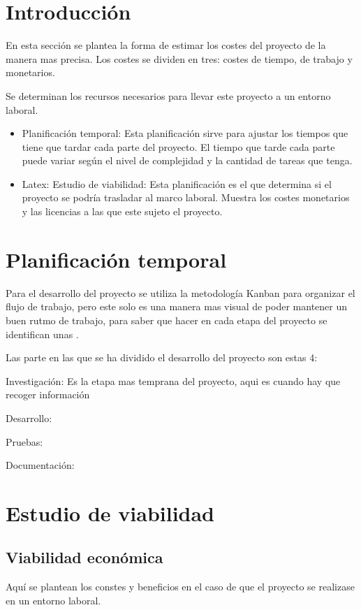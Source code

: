 
\section{Introducción}
En esta sección se plantea la forma de estimar los costes del proyecto de la manera mas precisa. Los costes se dividen en tres: costes de tiempo, de trabajo y monetarios.

Se determinan los recursos necesarios para llevar este proyecto a un entorno laboral.


\begin{itemize}
	\item Planificación temporal: Esta planificación sirve para ajustar los tiempos que tiene que tardar cada parte del proyecto. El tiempo que tarde cada parte puede variar según el nivel de complejidad y la cantidad de tareas que tenga.
	\item Latex: Estudio de viabilidad: Esta planificación es el que determina si el proyecto se podría trasladar al marco laboral. Muestra los costes monetarios y las licencias a las que este sujeto el proyecto.
\end{itemize}





\section{Planificación temporal}
Para el desarrollo del proyecto se utiliza la metodología Kanban para organizar el flujo de trabajo, pero este solo es una manera mas visual de poder mantener un buen rutmo de trabajo, para saber que hacer en cada etapa del proyecto se identifican unas .

Las parte en las que se ha dividido el desarrollo del proyecto son estas 4:

Investigación:
Es la etapa mas temprana del proyecto, aqui es cuando hay que recoger información


Desarrollo:


Pruebas: 


Documentación:

\section{Estudio de viabilidad}

\subsection{Viabilidad económica}
Aquí se plantean los constes y beneficios en el caso de que el proyecto se realizase en un entorno laboral.


